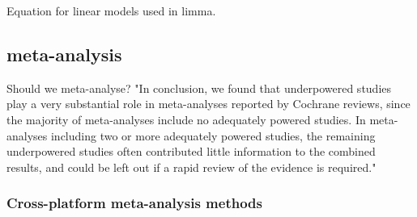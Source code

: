 Equation for linear models used in limma.

\subsection{ meta-analysis}

Should we meta-analyse?
"In conclusion, we found that underpowered studies play a very substantial role in meta-analyses reported by Cochrane reviews, since the majority of meta-analyses include no adequately powered studies. In meta-analyses including two or more adequately powered studies, the remaining underpowered studies often contributed little information to the combined results, and could be left out if a rapid review of the evidence is required."

\subsubsection{Cross-platform meta-analysis methods}

